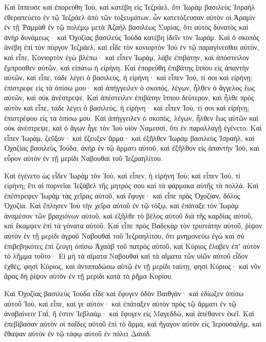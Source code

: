 {Καὶ ἵππευσε καὶ ἐπορεύθη Ἰοὺ, καὶ κατέβη εἰς Ἰεζράελ, ὅτι Ἰωρὰμ βασιλεὺς Ἰσραὴλ ἐθεραπεύετο ἐν τῷ Ἰεζράελ ἀπὸ τῶν τοξευμάτων, ὧν κατετόξευσαν αὐτὸν οἱ Ἀραμὶν ἐν τῇ Ῥαμμὰθ ἐν τῷ πολέμῳ μετὰ Ἁζαὴλ βασιλέως Συρίας, ὅτι αὐτὸς δυνατὸς καὶ ἀνὴρ δυνάμεως· καὶ Ὀχοζίας βασιλεὺς Ἰούδα κατέβη ἰδεῖν τὸν Ἰωράμ.
Καὶ ὁ σκοπὸς ἀνέβη ἐπὶ τὸν πύργον Ἰεζράελ, καὶ εἶδε τὸν κονιορτὸν Ἰοὺ ἐν τῷ παραγίνεσθαι αὐτὸν, καὶ εἶπε, Κονιορτὸν ἐγὼ βλέπω· καὶ εἶπεν Ἰωρὰμ, λάβε ἐπιβάτην, καὶ ἀπόστειλον ἔμπροσθεν αὐτῶν, καὶ εἰπάτω ἡ εἰρήνη.
Καὶ ἐπορεύθη ἐπιβάτης ἵππου εἰς ἀπαντὴν αὐτῶν, καὶ εἶπε, τάδε λέγει ὁ βασιλεὺς, ἡ εἰρήνη· καὶ εἶπεν Ἰού, τί σοι καὶ εἰρήνῃ; ἐπίστρεφε εἰς τὰ ὀπίσω μου· καὶ ἀπήγγειλεν ὁ σκοπὸς, λέγων, ἦλθεν ὁ ἄγγελος ἕως αὐτῶν, καὶ οὐκ ἀνέστρεψε.
Καὶ ἀπέστειλεν ἐπιβάτην ἵππου δεύτερον, καὶ ἦλθε πρὸς αὐτὸν καὶ εἶπε, τάδε λέγει ὁ βασιλεύς, ἡ εἰρήνη· καὶ εἶπεν Ἰοὺ, τί σοι καὶ εἰρήνῃ; ἐπιστρέφου εἰς τὰ ὀπίσω μου.
Καὶ ἀπήγγειλεν ὁ σκοπὸς, λέγων, ἦλθεν ἕως αὐτῶν καὶ οὐκ ἀνέστρεψε, καὶ ὁ ἄγων ἦγε τὸν Ἰοὺ υἱὸν Ναμεσσὶ, ὅτι ἐν παραλλαγῇ ἐγένετο.
Καὶ εἶπεν Ἰωρὰμ, ζεῦξον· καὶ ἔζευξεν ἅρμα· καὶ ἐξῆλθεν Ἰωρὰμ βασιλεὺς Ἰσραὴλ, καὶ Ὀχοζίας βασιλεὺς Ἰούδα, ἀνὴρ ἐν τῷ ἅρματι αὐτοῦ, καὶ ἐξῆλθον εἰς ἀπαντὴν Ἰοὺ, καὶ εὗρον αὐτὸν ἐν τῇ μερίδι Ναβουθαὶ τοῦ Ἰεζραηλίτου.
\par }{\PP {}Καὶ ἐγένετο ὡς εἶδεν Ἰωρὰμ τὸν Ἰοὺ, καὶ εἶπεν, ἡ εἰρήνη Ἰοὺ; καὶ εἶπεν Ἰού, τί εἰρήνη; ἔτι αἱ πορνεῖαι Ἰεζάβελ τῆς μητρός σου καὶ τὰ φάρμακα αὐτῆς τὰ πολλά.
Καὶ ἐπέστρεψεν Ἰωρὰμ τὰς χεῖρας αὐτοῦ, καὶ ἔφυγε· καὶ εἶπε πρὸς Ὀχοζίαν, δόλος Ὀχοζία.
Καὶ ἔπλησεν Ἰοὺ τὴν χεῖρα αὐτοῦ ἐν τῷ τόξῳ, καὶ ἐπάταξε τὸν Ἰωρὰμ ἀναμέσον τῶν βραχιόνων αὐτοῦ, καὶ ἐξῆλθε τὸ βέλος αὐτοῦ διὰ τῆς καρδίας αὐτοῦ, καὶ ἔκαμψεν ἐπὶ τὰ γόνατα αὐτοῦ.
Καὶ εἶπε πρὸς Βαδεκὰρ τὸν τριστάτην αὐτοῦ, ῥίψον αὐτὸν ἐν τῇ μερίδι ἀγροῦ Ναβουθαὶ τοῦ Ἰεζραηλίτου, ὅτι μνημονεύω ἐγὼ καὶ σὺ ἐπιβεβηκότες ἐπὶ ζεύγη ὀπίσω Ἀχαὰβ τοῦ πατρὸς αὐτοῦ, καὶ Κύριος ἔλαβεν ἐπʼ αὐτὸν τὸ λῆμμα τοῦτο·
Εἰ μὴ τὰ αἵματα Ναβουθαὶ καὶ τὰ αἵματα τῶν υἱῶν αὐτοῦ εἶδον ἐχθὲς, φησὶ Κύριος, καὶ ἀνταποδώσω αὐτῷ ἐν τῇ μερίδι ταύτῃ, φησὶ Κύριος· καὶ νῦν ἄρας δὴ ῥίψον αὐτὸν ἐν τῇ μερίδι κατὰ τὸ ῥῆμα Κυρίου.
\par }{\PP {}Καὶ Ὀχοζίας βασιλεὺς Ἰούδα εἶδε καὶ ἔφυγεν ὁδὸν Βαιθγάν· καὶ ἐδίωξεν ὀπίσω αὐτοῦ Ἰοὺ, καὶ εἶπε, καί γε αὐτόν· καὶ ἐπάταξεν αὐτὸν πρὸς τῷ ἅρματι ἐν τῷ ἀναβαίνειν Γαῒ, ἥ ἐστιν Ἰεβλαάμ· καὶ ἔφυγεν εἰς Μαγεδδὼ, καὶ ἀπέθανεν ἐκεῖ.
Καὶ ἐπεβίβασαν αὐτὸν οἱ παῖδες αὐτοῦ ἐπὶ τὸ ἅρμα, καὶ ἤγαγον αὐτὸν εἰς Ἱερουσαλὴμ, καὶ ἔθαψαν αὐτὸν ἐν τῷ τάφῳ αὐτοῦ ἐν πόλει Δαυίδ.
}

